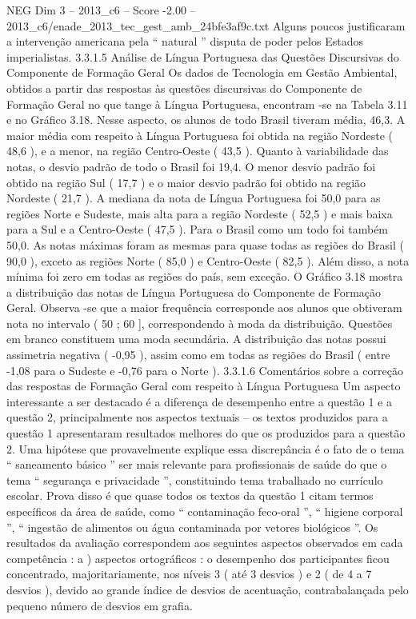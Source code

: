 \begin{textsample}{NEG Dim 3 – 2013\_c6 – Score -2.00 – 2013\_c6/enade\_2013\_tec\_gest\_amb\_24bfe3af9c.txt}
Alguns poucos justificaram a intervenção americana pela “ natural ” disputa de poder pelos Estados imperialistas. 3.3.1.5 Análise de Língua Portuguesa das Questões Discursivas do Componente de Formação Geral Os dados de Tecnologia em Gestão Ambiental, obtidos a partir das respostas às questões discursivas do Componente de Formação Geral no que tange à Língua Portuguesa, encontram -se na Tabela 3.11 e no Gráfico 3.18.
Nesse aspecto, os alunos de todo Brasil tiveram média, 46,3.
A maior média com respeito à Língua Portuguesa foi obtida na região Nordeste ( 48,6 ), e a menor, na região Centro-Oeste ( 43,5 ).
Quanto à variabilidade das notas, o desvio padrão de todo o Brasil foi 19,4.
O menor desvio padrão foi obtido na região Sul ( 17,7 ) e o maior desvio padrão foi obtido na região Nordeste ( 21,7 ).
A mediana da nota de Língua Portuguesa foi 50,0 para as regiões Norte e Sudeste, mais alta para a região Nordeste ( 52,5 ) e mais baixa para a Sul e a Centro-Oeste ( 47,5 ).
Para o Brasil como um todo foi também 50,0.
As notas máximas foram as mesmas para quase todas as regiões do Brasil ( 90,0 ), exceto as regiões Norte ( 85,0 ) e Centro-Oeste ( 82,5 ).
Além disso, a nota mínima foi zero em todas as regiões do país, sem exceção.
O Gráfico 3.18 mostra a distribuição das notas de Língua Portuguesa do Componente de Formação Geral.
Observa -se que a maior frequência corresponde aos alunos que obtiveram nota no intervalo ( 50 ; 60 ], correspondendo à moda da distribuição.
Questões em branco constituem uma moda secundária.
A distribuição das notas possui assimetria negativa ( -0,95 ), assim como em todas as regiões do Brasil ( entre -1,08 para o Sudeste e -0,76 para o Norte ). 3.3.1.6 Comentários sobre a correção das respostas de Formação Geral com respeito à Língua Portuguesa Um aspecto interessante a ser destacado é a diferença de desempenho entre a questão 1 e a questão 2, principalmente nos aspectos textuais – os textos produzidos para a questão 1 apresentaram resultados melhores do que os produzidos para a questão 2.
Uma hipótese que provavelmente explique essa discrepância é o fato de o tema “ saneamento básico ” ser mais relevante para profissionais de saúde do que o tema “ segurança e privacidade ”, constituindo tema trabalhado no currículo escolar.
Prova disso é que quase todos os textos da questão 1 citam termos específicos da área de saúde, como “ contaminação feco-oral ”, “ higiene corporal ”, “ ingestão de alimentos ou água contaminada por vetores biológicos ”.
Os resultados da avaliação correspondem aos seguintes aspectos observados em cada competência : a ) aspectos ortográficos : o desempenho dos participantes ficou concentrado, majoritariamente, nos níveis 3 ( até 3 desvios ) e 2 ( de 4 a 7 desvios ), devido ao grande índice de desvios de acentuação, contrabalançada pelo pequeno número de desvios em grafia.

\end{textsample}
